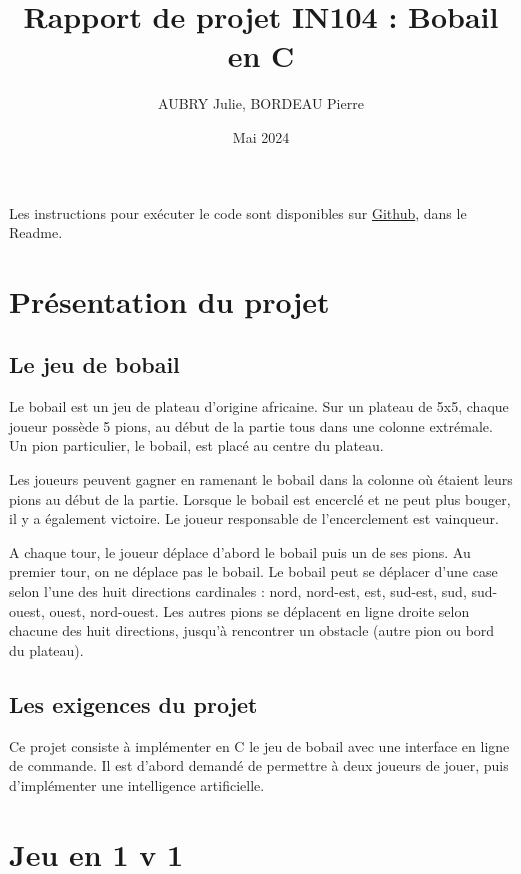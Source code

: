 \documentclass{article}
\title{Rapport de projet IN104 : Bobail en C}
\author{AUBRY Julie, BORDEAU Pierre}
\date{Mai 2024}
\begin{document}
\maketitle

Les instructions pour exécuter le code sont disponibles sur \href{https://github.com/pierrebrd/IN104_Projet/tree/main}{Github}, dans le Readme.

\section{Présentation du projet}

\subsection{Le jeu de bobail}

Le bobail est un jeu de plateau d'origine africaine. Sur un plateau de 5x5, chaque joueur possède 5 pions, au début de la partie tous dans une colonne extrémale. Un pion particulier, le bobail, est placé au centre du plateau.


Les joueurs peuvent gagner en ramenant le bobail dans la colonne où étaient leurs pions au début de la partie. Lorsque le bobail est encerclé et ne peut plus bouger, il y a également victoire. Le joueur responsable de l'encerclement est vainqueur.


A chaque tour, le joueur déplace d'abord le bobail puis un de ses pions. Au premier tour, on ne déplace pas le bobail.
Le bobail peut se déplacer d'une case selon l'une des huit directions cardinales : nord, nord-est, est, sud-est, sud, sud-ouest, ouest, nord-ouest.
Les autres pions se déplacent en ligne droite selon chacune des huit directions, jusqu'à rencontrer un obstacle (autre pion ou bord du plateau).

\subsection{Les exigences du projet}

Ce projet consiste à implémenter en C le jeu de bobail avec une interface en ligne de commande. Il est d'abord demandé de permettre à deux joueurs de jouer, puis d'implémenter une intelligence artificielle.



\section{Jeu en 1 v 1}
\end{document}
